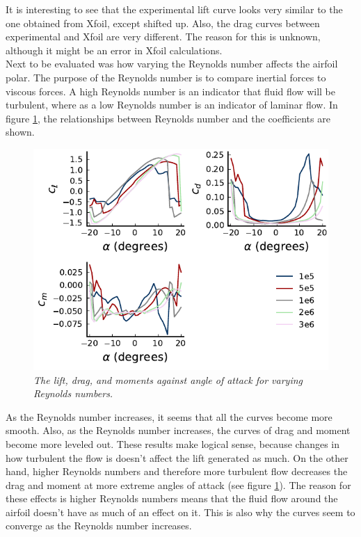 \documentclass[journal]{new-aiaa}
\begin{document}
	It is interesting to see that the experimental lift curve looks very similar to the one obtained from Xfoil, except shifted up. Also, the drag curves between experimental and Xfoil are very different. The reason for this is unknown, although it might be an error in Xfoil calculations.\\
	
	Next to be evaluated was how varying the Reynolds number affects the airfoil polar. The purpose of the Reynolds number is to compare inertial forces to viscous forces. A high Reynolds number is an indicator that fluid flow will be turbulent, where as a low Reynolds number is an indicator of laminar flow. In figure \ref{fig:altered-reynolds}, the relationships between Reynolds number and the coefficients are shown.\\
	
	\begin{figure}[H]
		\centering
		\includegraphics{../graphics/altered-reynolds.pdf}
		\caption{\emph{The lift, drag, and moments against angle of attack for varying Reynolds numbers.}}
		\label{fig:altered-reynolds}
	\end{figure}
	
	As the Reynolds number increases, it seems that all the curves become more smooth. Also, as the Reynolds number increases, the curves of drag and moment become more leveled out. These results make logical sense, because changes in how turbulent the flow is doesn't affect the lift generated as much. On the other hand, higher Reynolds numbers and therefore more turbulent flow decreases the drag and moment at more extreme angles of attack (see figure \ref{fig:altered-reynolds}). The reason for these effects is higher Reynolds numbers means that the fluid flow around the airfoil doesn't have as much of an effect on it. This is also why the curves seem to converge as the Reynolds number increases.\\
	
\end{document}
